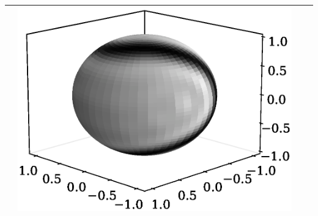 \documentclass[12pt,twoside]{article}
\begin{document}
\begin{table}
\begin{tabular}{p{0.5cm}p{3cm}p{4cm}p{4cm}}
            & \includegraphics[scale=0.25]{./figs/sph_harm_bike.eps}
            \\ 
            \hline
            

\end{tabular}
\end{table}
\end{document}
